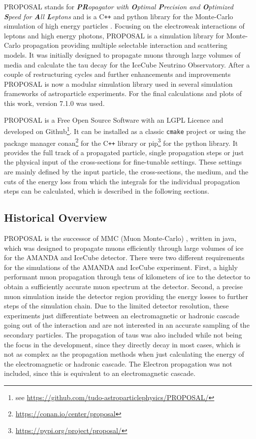 PROPOSAL stands for \textit{\textbf{PR}opagator with \textbf{O}ptimal \textbf{P}recision and \textbf{O}ptimized \textbf{S}peed for \textbf{A}ll \textbf{L}eptons} and is a C\texttt{++} and python library for the Monte-Carlo simulation of high energy particles \cite{Koehne13PROPOSAL}.
Focusing on the electroweak interactions of leptons and high energy photons, PROPOSAL is a simulation library for Monte-Carlo propagation providing multiple selectable interaction and scattering models.
It was initially designed to propagate muons through large volumes of media and calculate the tau decay for the IceCube Neutrino Observatory.
After a couple of restructuring cycles and further enhancements and improvements PROPOSAL is now a modular simulation library used in several simulation frameworks of astroparticle experiments.
For the final calculations and plots of this work, version 7.1.0 was used.

PROPOSAL is a Free Open Source Software with an LGPL Licence and developed on Github\footnote{see \url{https://github.com/tudo-astroparticlephysics/PROPOSAL/}}.
It can be installed as a classic \texttt{cmake} project or using the package manager conan\footnote{\url{https://conan.io/center/proposal}} for the C\texttt{++} library or pip\footnote{\url{https://pypi.org/project/proposal/}} for the python library.
It provides the full track of a propagated particle, single propagation steps or just the physical input of the cross-sections for fine-tunable settings.
These settings are mainly defined by the input particle, the cross-sections, the medium, and the cuts of the energy loss from which the integrals for the individual propagation steps can be calculated, which is described in the following sections.

%

\subsection{Historical Overview}

PROPOSAL is the successor of MMC (Muon Monte-Carlo) \cite{Chirkin03PhD, Chirkin04MMC}, written in java, which was designed to propagate muons efficiently through large volumes of ice for the AMANDA and IceCube detector.
There were two different requirements for the simulations of the AMANDA and IceCube experiment.
First, a highly performant muon propagation through tens of kilometers of ice to the detector to obtain a sufficiently accurate muon spectrum at the detector.
Second, a precise muon simulation inside the detector region providing the energy losses to further steps of the simulation chain.
Due to the limited detector resolution, these experiments just differentiate between an electromagnetic or hadronic cascade going out of the interaction and are not interested in an accurate sampling of the secondary particles.
The propagation of taus was also included while not being the focus in the development, since they directly decay in most cases, which is not as complex as the propagation methods when just calculating the energy of the electromagnetic or hadronic cascade.
The Electron propagation was not included, since this is equivalent to an electromagnetic cascade.

